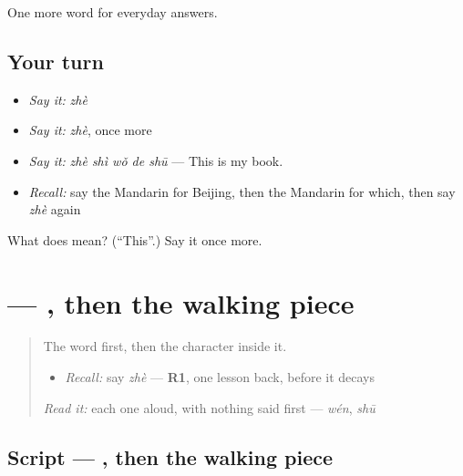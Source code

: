 \begin{grammarlens}[title={What you've built}]
One more word for everyday answers.
\end{grammarlens}

\subsection*{Your turn}
\begin{itemize}
\raggedright
  \item \emph{Say it:} \emph{zhè}
  \item \emph{Say it:} \emph{zhè}, once more
  \item \emph{Say it:} \emph{zhè shì wǒ de shū} — This is my book.
  \item \emph{Recall:} say the Mandarin for Beijing, then the Mandarin for which, then say \emph{zhè} again
\end{itemize}

\begin{tcolorbox}[breakable,colback=teal!4,colframe=teal!35!black,title={Before you move on}]
What does  mean? (\textquotedblleft{}This\textquotedblright{}.) Say it once more.
\end{tcolorbox}
\section[\texorpdfstring{\zh{这} (zhè)}{这 (zhè)}]{ — , then the walking piece}

\label{lesson:ZH-W37-zhe}



\begin{quote}
The word first, then the character inside it.

\begin{itemize}
\raggedright
  \item \emph{Recall:} say \emph{zhè} — \textbf{R1}, one lesson back, before it decays
\end{itemize}

\begin{quote}
 
\end{quote}

\emph{Read it:} each one aloud, with nothing said first — \emph{wén}, \emph{shū}
\end{quote}

\subsection*{Script — , then the walking piece}


